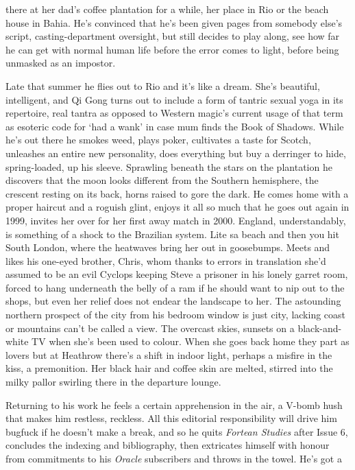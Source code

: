 \documentclass[
]{article}
\begin{document}
there at her dad's coffee plantation for a while, her place in Rio or
the beach house in Bahia. He's convinced that he's been given pages from
somebody else's script, casting-department oversight, but still decides
to play along, see how far he can get with normal human life before the
error comes to light, before being unmasked as an impostor. \par
Late that summer he flies out to Rio and it's like a dream. She's
beautiful, intelligent, and Qi Gong turns out to include a form of
tantric sexual yoga in its repertoire, real tantra as opposed to Western
magic's current usage of that term as esoteric code for `had a wank' in
case mum finds the Book of Shadows. While he's out there he smokes weed,
plays poker, cultivates a taste for Scotch, unleashes an entire new
personality, does everything but buy a derringer to hide, spring-loaded,
up his sleeve. Sprawling beneath the stars on the plantation he
discovers that the moon looks different from the Southern hemisphere,
the crescent resting on its back, horns raised to gore the dark. He
comes home with a proper haircut and a roguish glint, enjoys it all so
much that he goes out again in 1999, invites her over for her first away
match in 2000. England, understandably, is something of a shock to the
Brazilian system. Lite sa beach and then you hit South London, where the
heatwaves bring her out in goosebumps. Meets and likes his one-eyed
brother, Chris, whom thanks to errors in translation she'd assumed to be
an evil Cyclops keeping Steve a prisoner in his lonely garret room,
forced to hang underneath the belly of a ram if he should want to nip
out to the shops, but even her relief does not endear the landscape to
her. The astounding northern prospect of the city from his bedroom
window is just city, lacking coast or mountains can't be called a view.
The overcast skies, sunsets on a black-and-white TV when she's been used
to colour. When she goes back home they part as lovers but at Heathrow
there's a shift in indoor light, perhaps a misfire in the kiss, a
premonition. Her black hair and coffee skin are melted, stirred into the
milky pallor swirling there in the departure lounge. \par
Returning to his work he feels a certain apprehension in the air,
a V-bomb hush that makes him restless, reckless. All this editorial
responsibility will drive him bugfuck if he doesn't make a break, and so
he quits \emph{Fortean Studies} after Issue 6, concludes the indexing
and bibliography, then extricates himself with honour from commitments
to his \emph{Oracle} subscribers and throws in the towel. He's got a
\end{document}
